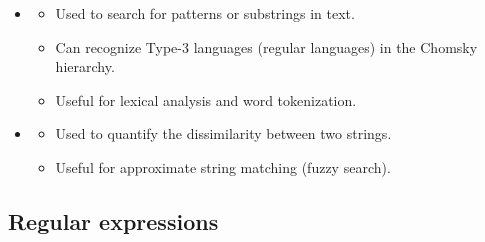 \documentclass[xcolor=table]{beamer}
\begin{document}
\begin{frame}
	\frametitle{\insertshortsubtitle}
	\framesubtitle{\insertsection}

	\begin{itemize}
		\item {}
		\begin{itemize}
			\item Used to search for patterns or substrings in text.
			\item Can recognize Type-3 languages (regular languages) in the Chomsky hierarchy.
			\item Useful for lexical analysis and word tokenization.
		\end{itemize}
		\item {}
		\begin{itemize}
			\item Used to quantify the dissimilarity between two strings.
			\item Useful for approximate string matching (fuzzy search).
		\end{itemize}
	\end{itemize}

\end{frame}

\subsection{Regular expressions}
\end{document}
